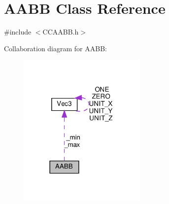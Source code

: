 \hypertarget{classAABB}{}\section{A\+A\+BB Class Reference}
\label{classAABB}


{\ttfamily \#include $<$C\+C\+A\+A\+B\+B.\+h$>$}



Collaboration diagram for A\+A\+BB\+:
\nopagebreak
\begin{figure}[H]
\begin{center}
\leavevmode
\includegraphics[width=177pt]{classAABB__coll__graph}
\end{center}
\end{figure}
